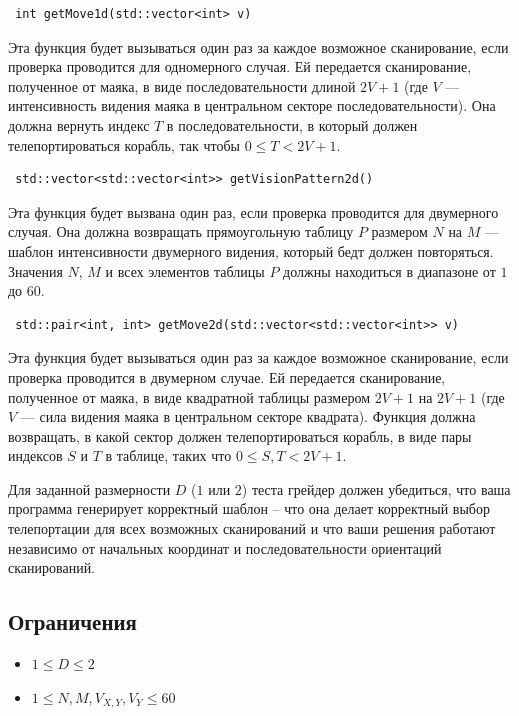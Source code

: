 \documentclass[12pt]{article}
\begin{document}
\begin{lstlisting}
 int getMove1d(std::vector<int> v)
\end{lstlisting}

Эта функция будет вызываться один раз за каждое возможное сканирование, если проверка проводится для одномерного случая. Ей передается сканирование, полученное от маяка, в виде последовательности длиной $2V + 1$ (где $V$ — интенсивность видения маяка в центральном секторе последовательности). Она должна вернуть индекс $T$ в последовательности, в который должен телепортироваться корабль, так чтобы $0 \leq T < 2V + 1$.

\begin{lstlisting}
 std::vector<std::vector<int>> getVisionPattern2d()
\end{lstlisting}

Эта функция будет вызвана один раз, если проверка проводится для двумерного случая. Она должна возвращать прямоугольную таблицу $P$ размером $N$ на $M$ — шаблон интенсивности двумерного видения, который бедт должен повторяться. Значения $N$, $M$ и всех элементов таблицы $P$ должны находиться в диапазоне от $1$ до $60$.

\begin{lstlisting}
 std::pair<int, int> getMove2d(std::vector<std::vector<int>> v)
\end{lstlisting}

Эта функция будет вызываться один раз за каждое возможное сканирование, если проверка проводится в двумерном случае. Ей передается сканирование, полученное от маяка, в виде квадратной таблицы размером $2V + 1$ на $2V + 1$ (где $V$ — сила видения маяка в центральном секторе квадрата). Функция должна возвращать, в какой сектор должен телепортироваться корабль, в виде пары индексов $S$ и $T$ в таблице, таких что $0 \leq S, T < 2V + 1$.

Для заданной размерности $D$ ($1$ или $2$) теста грейдер должен убедиться, что ваша программа генерирует корректный шаблон -- что она делает корректный выбор телепортации для всех возможных сканирований и что ваши решения работают независимо от начальных координат и последовательности ориентаций сканирований.

\subsection{Ограничения}

\vspace{0.1em}

\begin{itemize}
\item $1 \leq D \leq 2$
\item $1 \leq N, M, V_{X, Y}, V_Y \leq 60$
\end{itemize}
\end{document}
